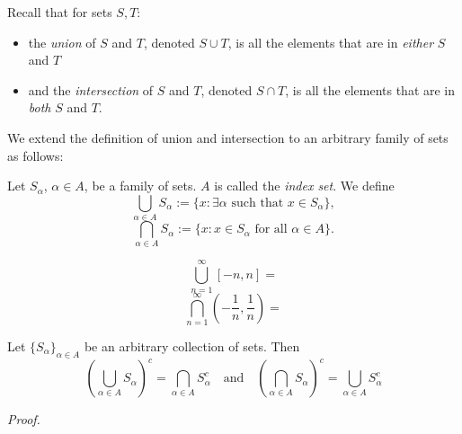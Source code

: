 \documentclass [aspectratio=169, handout]{beamer}
\begin{document}
\begin{frame}

Recall that for sets $S, T$:
    \begin{itemize}
    	\item  the \emph{union} of $S$ and $T$, denoted $S \cup T$, is all the elements that are in \emph{either} $S$ and $T$
	\item  and the \emph{intersection} of $S$ and $T$, denoted $S \cap T$, is all the elements that are in \emph{both} $S$ and $T$.
    \end{itemize}

We extend the definition of union and intersection to an arbitrary family of sets as follows:

\begin{definition}
Let $S_\alpha$, $\alpha \in A$, be a family of sets. $A$ is called the \emph{index set}. We define
\begin{equation*}
    \bigcup_{\alpha \in A} S_\alpha := \{ x: \exists \alpha \text{ such that } x \in S_\alpha \},
\end{equation*}
\begin{equation*}
    \bigcap_{\alpha \in A} S_\alpha := \{ x: x \in S_\alpha \text{ for all } \alpha \in A \}.
\end{equation*}
\end{definition}

\end{frame}

\begin{frame}

\begin{example}
$$\bigcup_{n=1}^\infty [-n,n] = $$
$$\bigcap_{n=1}^\infty \left( -\frac{1}{n},\frac{1}{n} \right) = $$
\end{example}

\end{frame}


\begin{frame}
\begin{theorem}
Let $\{S_\alpha\}_{\alpha \in A}$ be an arbitrary collection of sets. Then 
\begin{equation*}
    \left( \bigcup_{\alpha \in A} S_\alpha \right)^c = \bigcap_{\alpha \in A}  S_\alpha^c \quad \text{and} \quad \left( \bigcap_{\alpha \in A} S_\alpha \right)^c = \bigcup_{\alpha \in A}  S_\alpha^c
\end{equation*}
\end{theorem}
\textit{Proof.}
\vspace{8em}

\end{frame}
\end{document}
